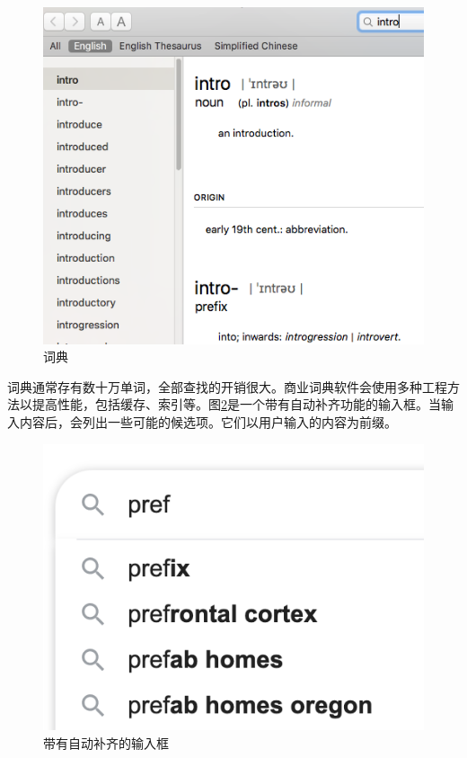 \documentclass[b5paper]{ctexart}
\begin{document}
\begin{figure}[htbp]
  \centering
  \includegraphics[scale=0.5]{img/edict-en.png}
  \caption{词典}
  \label{fig:e-dict}
\end{figure}

词典通常存有数十万单词，全部查找的开销很大。商业词典软件会使用多种工程方法以提高性能，包括缓存、索引等。图\ref{fig:word-completion}是一个带有自动补齐功能的输入框。当输入内容后，会列出一些可能的候选项。它们以用户输入的内容为前缀。

\begin{figure}[htbp]
  \centering
  \includegraphics[scale=0.5]{img/adaptive-input.png}
  \caption{带有自动补齐的输入框}
  \label{fig:word-completion}
\end{figure}
\end{document}
